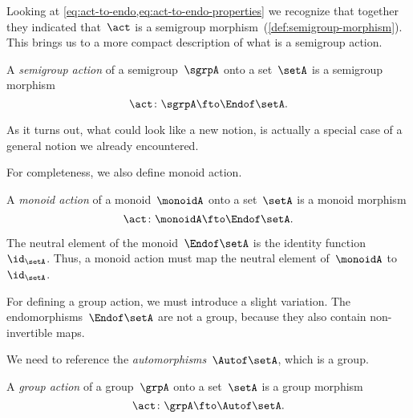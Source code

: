 Looking at \cref{eq:act-to-endo,eq:act-to-endo-properties} we recognize that together
they indicated that~$\act$ is a semigroup morphism~(\cref{def:semigroup-morphism}). This brings us to a more compact description of what is a semigroup action.

\begin{ctdefinition}\label{def:semigroup-action}
  A \emph{semigroup action} of a semigroup~$\sgrpA$ onto a set~$\setA$ is a semigroup morphism
  \begin{equation}\label{eq:act-semigroup}
    \act \colon \sgrpA \fto \Endof\setA.
  \end{equation}
\end{ctdefinition}

As it turns out, what could look like a new notion, is actually a special case of a general notion we already encountered.

For completeness, we also define monoid action.

\begin{ctdefinition}\label{def:monoid-action}
  A \emph{monoid action} of a monoid~$\monoidA$ onto a set~$\setA$ is a monoid morphism
  \begin{equation}\label{eq:act-monoid}
    \act \colon \monoidA \fto \Endof\setA.
  \end{equation}
\end{ctdefinition}

The neutral element of the monoid~$\Endof\setA$ is the identity function~$\id_{\setA}$.
Thus, a monoid action must map the neutral element of~$\monoidA$ to~$\id_{\setA}$.
%

For defining a group action, we must introduce a slight variation.
The endomorphisms~$\Endof\setA$ are not a group, because they also contain non-invertible maps.

We need to reference the \emph{automorphisms}~$\Autof\setA$, which is a group.

\begin{ctdefinition}\label{def:group-action}
  A \emph{group action} of a group~$\grpA$ onto a set~$\setA$ is a group morphism
  \begin{equation}\label{eq:act-group}
    \act \colon \grpA \fto \Autof\setA.
  \end{equation}
\end{ctdefinition}

